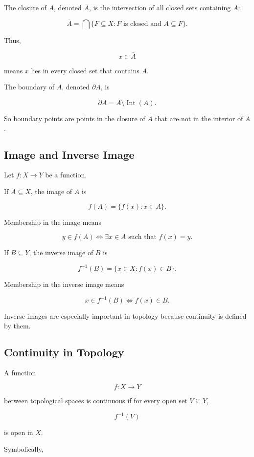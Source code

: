\documentclass{article}
\begin{document}
	The closure of \(A\), denoted \(\overline{A}\), is the intersection of all closed sets containing \(A\):
	
	$$
	\overline{A}
	=
	\bigcap\{F\subseteq X:F\text{ is closed and }A\subseteq F\}.
	$$
	
	Thus,
	
	$$
	x\in\overline{A}
	$$
	
	means \(x\) lies in every closed set that contains \(A\).
	
	The boundary of \(A\), denoted \(\partial A\), is
	
	$$
	\partial A=\overline{A}\setminus \operatorname{Int}(A).
	$$
	
	So boundary points are points in the closure of \(A\) that are not in the interior of \(A\).
	
	\subsection{Image and Inverse Image}
	
	Let \(f:X\to Y\) be a function.
	
	If \(A\subseteq X\), the image of \(A\) is
	
	$$
	f(A)=\{f(x):x\in A\}.
	$$
	
	Membership in the image means
	
	$$
	y\in f(A)
	\iff
	\exists x\in A\text{ such that }f(x)=y.
	$$
	
	If \(B\subseteq Y\), the inverse image of \(B\) is
	
	$$
	f^{-1}(B)=\{x\in X:f(x)\in B\}.
	$$
	
	Membership in the inverse image means
	
	$$
	x\in f^{-1}(B)
	\iff
	f(x)\in B.
	$$
	
	Inverse images are especially important in topology because continuity is defined by them.
	
	\subsection{Continuity in Topology}
	
	A function
	
	$$
	f:X\to Y
	$$
	
	between topological spaces is continuous if for every open set \(V\subseteq Y\),
	
	$$
	f^{-1}(V)
	$$
	
	is open in \(X\).
	
	Symbolically,
	
\end{document}
